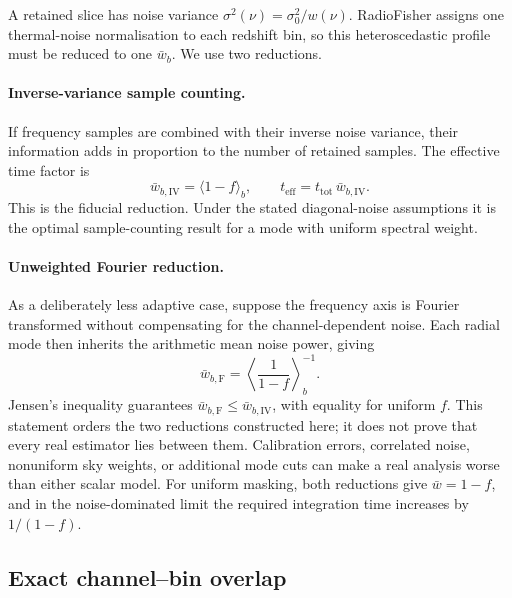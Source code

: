 A retained slice has noise variance $\sigma^2(\nu)=\sigma_0^2/w(\nu)$.
RadioFisher assigns one thermal-noise normalisation to each redshift
bin, so this heteroscedastic profile must be reduced to one $\bar{w}_b$.
We use two reductions.

\paragraph{Inverse-variance sample counting.}
If frequency samples are combined with their inverse noise variance,
their information adds in proportion to the number of retained samples.
The effective time factor is
\begin{equation}
\label{eq:wiv}
\bar{w}_{b,\mathrm{IV}} = \langle 1-f \rangle_b, \qquad
t_\mathrm{eff} = t_\mathrm{tot}\,\bar{w}_{b,\mathrm{IV}}.
\end{equation}
This is the fiducial reduction. Under the stated diagonal-noise
assumptions it is the optimal sample-counting result for a mode with
uniform spectral weight.

\paragraph{Unweighted Fourier reduction.}
As a deliberately less adaptive case, suppose the frequency axis is
Fourier transformed without compensating for the channel-dependent
noise. Each radial mode then inherits the arithmetic mean noise power,
giving
\begin{equation}
\label{eq:wf}
\bar{w}_{b,\mathrm{F}} =
\left\langle \frac{1}{1-f} \right\rangle_b^{-1}.
\end{equation}
Jensen's inequality guarantees
$\bar{w}_{b,\mathrm{F}} \le \bar{w}_{b,\mathrm{IV}}$, with equality for
uniform $f$. This statement orders the two reductions constructed here;
it does not prove that every real estimator lies between them.
Calibration errors, correlated noise, nonuniform sky weights, or
additional mode cuts can make a real analysis worse than either scalar
model. For uniform masking, both reductions give $\bar{w}=1-f$, and in
the noise-dominated limit the required integration time increases by
$1/(1-f)$.

\subsection{Exact channel--bin overlap}
\label{sec:overlap}

